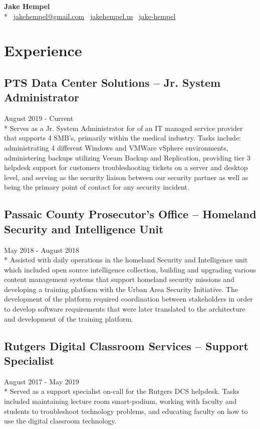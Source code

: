 \documentclass{article}
\begin{document}
\begin{samepage}
\begin{center}
\huge{\textbf{Jake Hempel}} \\*
\large{\faEnvelope \, \href{mailto:jakehempel@gmail.com}{jakehempel@gmail.com}
\faGlobe \, \href{https://jakehempel.us}{jakehempel.us}}
\faLinkedinSquare \, \href{https://www.linkedin.com/in/jake-hempel/}{jake-hempel}
\end{center}

\section{Experience}

\subsection{PTS Data Center Solutions -- Jr. System Administrator}
August 2019 - Current\\*
Serves as a Jr. System Administrator for of an IT managed service provider that supports 4 SMB's, primarily within the medical industry. Tasks include: administrating 4 different Windows and VMWare vSphere environments, administering backups utilizing Veeam Backup and Replication, providing tier 3 helpdesk support for customers troubleshooting tickets on a server and desktop level, and serving as the security liaison between our security partner as well as being the primary point of contact for any security incident.

\subsection{Passaic County Prosecutor's Office -- Homeland Security and Intelligence Unit}
May 2018 - August 2018\\*
Assisted with daily operations in the homeland Security and Intelligence unit which included open source intelligence collection, building and upgrading various content management systems that support homeland security missions and developing a training platform with the Urban Area Security Initiative.  The development of the platform required coordination between stakeholders in order to develop software requirements that were later translated to the architecture and development of the training platform.

\subsection{Rutgers Digital Classroom Services -- Support Specialist}
August 2017 - May 2019\\*
Served as a support specialist on-call for the Rutgers DCS helpdesk. Tasks included maintaining lecture room smart-podium, working with faculty and students to troubleshoot technology problems, and educating faculty on how to use the digital classroom technology.


\end{samepage}
\end{document}
